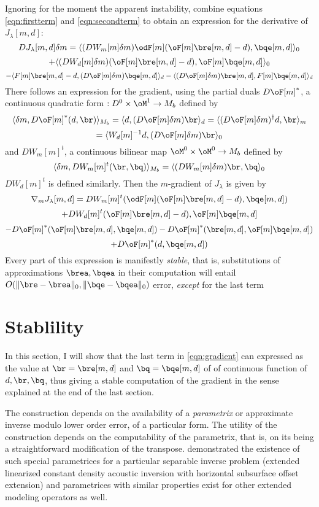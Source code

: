 Ignoring for the moment the apparent instability, combine equations
\ref{eqn:firstterm} and \ref{eqn:secondterm} to obtain an expression for the
derivative of $J_{\lambda}[m,d]$:
\[
DJ_{\lambda}[m,d]\delta m = \langle (DW_m[m]\delta m)
\odF[m](\oF[m]\bre[m,d]-d),\bqe[m,d]\rangle_0 
\]
\[
+ \langle (DW_d[m]\delta
m)(\oF[m]\bre[m,d]-d),\oF[m]\bqe[m,d]\rangle_0
\]
\begin{equation}
\label{deriv1}
- \langle F[m]\bre[m,d]-d,(D\oF[m]\delta m)\bqe[m,d]\rangle_d
- \langle (D\oF[m]\delta m)\bre[m,d],F[m]\bqe[m,d]\rangle_d
\end{equation}
There follows an expression for the gradient, using the partial
duals $D\oF[m]^*$, a continuous quadratic form $: D^0 \times \oM^1
\rightarrow M_b$ defined by
\[
\langle \delta m, D\oF[m]^*(d,\br)\rangle_{M_b} = \langle d,
(D\oF[m]\delta m)\br\rangle_d = \langle (D\oF[m]\delta
m)^{\dagger}d,\br\rangle_m
\]
\begin{equation}
\label{eqn:dual}
= \langle W_d[m]^{-1}d,(D\oF[m]\delta m)\br\rangle_0
\end{equation}
and $DW_m[m]^t$, a continuous bilinear map $\oM^0 \times \oM^0
\rightarrow M_b$ defined by 
\[
\langle \delta m, DW_m[m]^t(\br,\bq) \rangle_{M_b} = 
\langle (DW_m[m]\delta m)\br,\bq\rangle_0
\]
$DW_d[m]^t$ is defined similarly.
Then the $m$-gradient of $J_{\lambda}$ is given by
\[
\nabla_m J_{\lambda}[m,d] = DW_m[m]^t(\odF[m](\oF[m]\bre[m,d]-d),\bqe[m,d])
\]
\[
+ DW_d[m]^t(\oF[m]\bre[m,d]-d),\oF[m]\bqe[m,d]
\]
\[
- D\oF[m]^*(\oF[m]\bre[m,d],\bqe[m,d]) -
D\oF[m]^*(\bre[m,d],\oF[m]\bqe[m,d])
\]
\begin{equation}
\label{eqn:gradient}
+D\oF[m]^*(d,\bqe[m,d])
\end{equation}
Every part of this expression is manifestly {\em stable}, that is,  substitutions of
approximations $\brea,\bqea$ in their computation will entail 
$O(\|\bre - \brea\|_0, \|\bqe-\bqea\|_0)$ error, {\em except} for the
last term

\section{Stablility}
In this section, I will show that the last term in \ref{eqn:gradient} can 
expressed as the value at $\br=\bre[m,d]$ and $\bq=\bqe[m,d]$ of 
of continuous function of $d, \br,\bq$, thus giving a stable
computation of the gradient in the sense explained at the end of the
last section.

The construction depends on the availability of a {\em parametrix} or
approximate inverse modulo lower order error, of a particular
form. The utility of the construction depends on the computability of
the parametrix, that is, on its being a straightforward modification of the
transpose. \cite[]{HouSymes:15} demonstrated the existence of such special
parametrices for a particular separable inverse problem (extended
linearized constant density acoustic inversion with horizontal
subsurface offset extension) and parametrices with similar properties
exist for other extended modeling operators as well.

